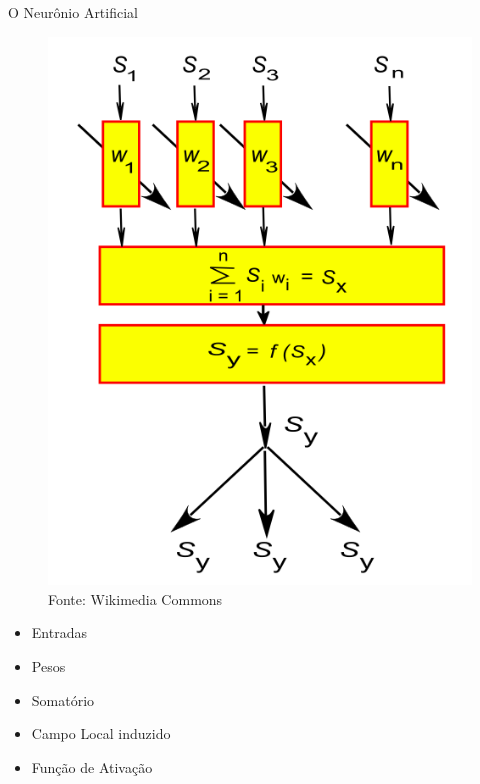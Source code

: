 \documentclass{beamer}
\begin{document}
      \begin{frame}{O Neurônio Artificial}
	\begin{figure}[htpb]
	  \includegraphics[scale=0.2]{neuronio2.png}
	  \caption{Fonte: Wikimedia Commons }
	\end{figure}
	
	\begin{itemize}
	  \item Entradas
	  \item Pesos
	  \item Somatório
	  \item Campo Local induzido
	  \item Função de Ativação
	\end{itemize}
      \end{frame}
      
\end{document}
